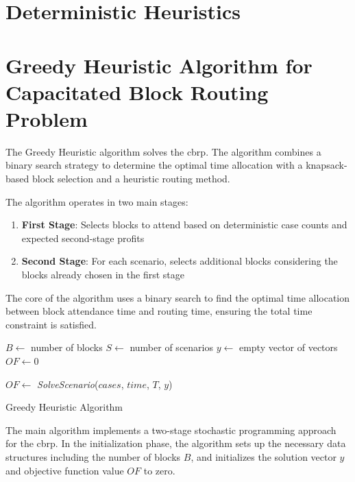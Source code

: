 \section{Deterministic Heuristics}\label{sec:deterministic-heuristics}

\newcommand{\Call}[2]{\textit{#1}(#2)}

\section{Greedy Heuristic Algorithm for Capacitated Block Routing Problem}

The Greedy Heuristic algorithm solves the \gls{cbrp}.
The algorithm combines a binary search strategy to determine the optimal time allocation with a
knapsack-based block selection and a heuristic routing method.

The algorithm operates in two main stages:
\begin{enumerate}
	\item \textbf{First Stage}: Selects blocks to attend based on deterministic case counts and expected second-stage profits
	\item \textbf{Second Stage}: For each scenario, selects additional blocks considering the blocks already chosen in the first stage
\end{enumerate}

The core of the algorithm uses a binary search to find the optimal time allocation between block
attendance time and routing time, ensuring the total time constraint is satisfied.

\begin{algorithm}[H]
	\SetAlgoLined

	$B \leftarrow$ number of blocks\;
	$S \leftarrow$ number of scenarios\;
	$y \leftarrow$ empty vector of vectors\;
	$OF \leftarrow 0$\;


	$OF \leftarrow$ \Call{SolveScenario}{$cases$, $time$, $T$, $y$}\;

	\;
	\caption{Greedy Heuristic Algorithm}
\end{algorithm}

The main algorithm implements a two-stage stochastic programming approach for the \gls{cbrp}.
In the initialization phase, the algorithm sets up the necessary data structures including the
number of blocks $B$, and initializes the solution vector $y$ and objective function value $OF$ to zero.

